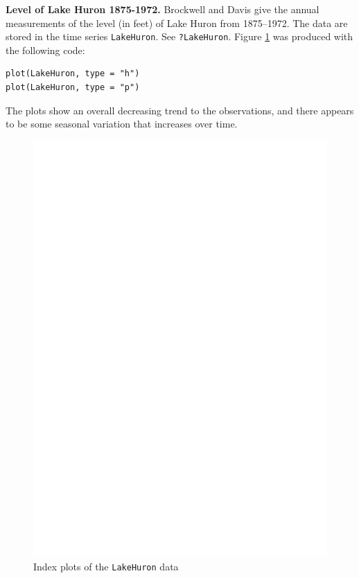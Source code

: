 \documentclass[captions=tableheading]{scrbook}
\begin{document}
\begin{example}
\textbf{Level of Lake Huron 1875-1972.} Brockwell and Davis \cite{Brockwell1991} give the annual measurements of the level (in feet) of Lake Huron from 1875--1972. The data are stored in the time series \texttt{LakeHuron}. See \texttt{?LakeHuron}. Figure \ref{fig:indpl-lakehuron} was produced with the following code:


\begin{verbatim}
plot(LakeHuron, type = "h")
plot(LakeHuron, type = "p")
\end{verbatim}

The plots show an overall decreasing trend to the observations, and there appears to be some seasonal variation that increases over time. 







\begin{figure}[th]
  \includegraphics[angle=270, totalheight=4in]{ps/indpl-lakehuron.ps}
  \caption{Index plots of the \texttt{LakeHuron} data}
  \label{fig:indpl-lakehuron}
\end{figure}


\end{example}
\end{document}
